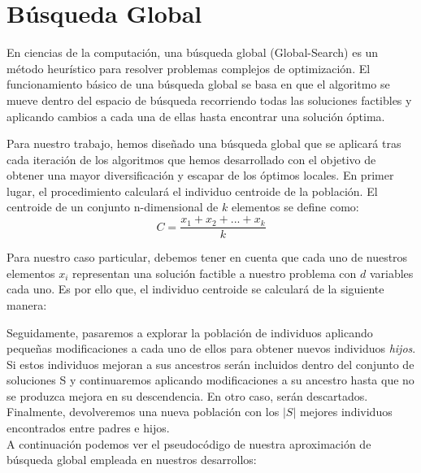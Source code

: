 \section{Búsqueda Global}\label{sec:BG}

En ciencias de la computación, una búsqueda global (Global-Search) es un método heurístico para resolver problemas complejos de optimización\cite{GlobalSearch, GlobalSearch2, GlobalSearch3}. %
%
El funcionamiento básico de una búsqueda global se basa en que el algoritmo se mueve dentro del espacio de búsqueda recorriendo todas las soluciones factibles y aplicando cambios a cada una de ellas hasta encontrar una solución óptima. 

Para nuestro trabajo, hemos diseñado una búsqueda global que se aplicará tras cada iteración de los algoritmos que hemos desarrollado con el objetivo de obtener una mayor diversificación y escapar de los óptimos locales. En primer lugar, el procedimiento calculará el individuo centroide de la población. El centroide de un conjunto n-dimensional de $k$ elementos se define como:
\begin{equation}\label{centroide}
    C = \frac{x_{1} + x_{2} + ... + x_{k}}{k}
\end{equation}

Para nuestro caso particular, debemos tener en cuenta que cada uno de nuestros elementos $x_{i}$ representan una solución factible a nuestro problema con $d$ variables cada uno. Es por ello que, el individuo centroide se calculará de la siguiente manera: 

Seguidamente, pasaremos a explorar la población de individuos aplicando pequeñas modificaciones a cada uno de ellos para obtener nuevos individuos \textit{hijos}. Si estos individuos mejoran a sus ancestros serán incluidos dentro del conjunto de soluciones S y continuaremos aplicando modificaciones a su ancestro hasta que no se produzca mejora en su descendencia. En otro caso, serán descartados.
Finalmente, devolveremos una nueva población con los $|S|$ mejores individuos encontrados entre padres e hijos. \\
A continuación podemos ver el pseudocódigo de nuestra aproximación de búsqueda global empleada en nuestros desarrollos: 

